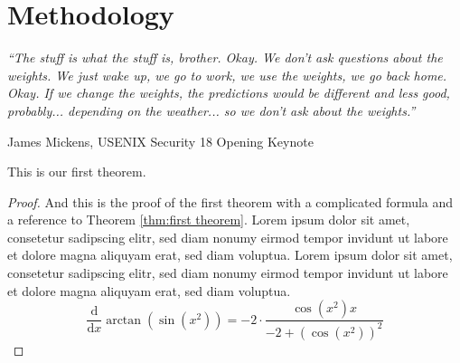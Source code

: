 \documentclass[a4paper, oneside]{discothesis}
\begin{document}
\newpage

\chapter{Methodology}

\begin{quotebox}
	\begin{flushright}
		\textit{``The stuff is what the stuff is, brother. Okay. We don't ask questions about the weights. We just wake up, we go to work, we use the weights, we go back home. Okay. If we change the weights, the predictions would be different and less good, probably... depending on the weather... so we don't ask about the weights.''}
		
		\textemdash{} James Mickens, USENIX Security 18 Opening Keynote~\cite{218395}
	\end{flushright}
\end{quotebox}


\begin{theorem} \label{thm:first theorem}
	This is our first theorem.
\end{theorem}

\begin{proof}
	And this is the proof of the first theorem with a complicated formula and a reference to Theorem \ref{thm:first theorem}. Lorem ipsum dolor sit amet, consetetur sadipscing elitr, sed diam nonumy eirmod tempor invidunt ut labore et dolore magna aliquyam erat, sed diam voluptua. Lorem ipsum dolor sit amet, consetetur sadipscing elitr, sed diam nonumy eirmod tempor invidunt ut labore et dolore magna aliquyam erat, sed diam voluptua.
	\begin{equation}
		{\frac {\mathrm d}{\mathrm dx}}\arctan(\sin({x}^{2}))=-2 \cdot {\frac {\cos({x}^{2})x}{-2+\left (\cos({x}^{2})\right )^{2}}}
	\end{equation}	
\end{proof}















\end{document}
